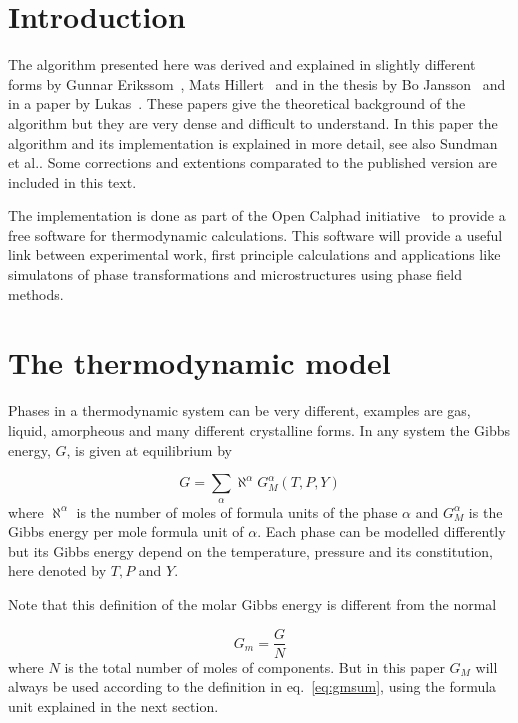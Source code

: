 \documentclass[12pt]{article}
\begin{document}
\tableofcontents

\newpage

\section{Introduction}

The algorithm presented here was derived and explained in slightly
different forms by Gunnar Erikssom~\cite{75Eri}, Mats
Hillert~\cite{81Hil} and in the thesis by Bo Jansson~\cite{84Jan} and
in a paper by Lukas~\cite{82Luk}.  These papers give the theoretical
background of the algorithm but they are very dense and difficult to
understand.  In this paper the algorithm and its implementation is
explained in more detail, see also Sundman et al.\cite{15Sun2}.  Some
corrections and extentions comparated to the published version are
included in this text.

The implementation is done as part of the Open Calphad
initiative~\cite{15Sun1} to provide a free software for thermodynamic
calculations.  This software will provide a useful link between
experimental work, first principle calculations and applications like
simulatons of phase transformations and microstructures using phase
field methods.

\section{The thermodynamic model}

Phases in a thermodynamic system can be very different, examples are
gas, liquid, amorpheous and many different crystalline forms.  In any
system the Gibbs energy, $G$, is given at equilibrium by

\begin{equation}
G = \sum_{\alpha} \aleph^{\alpha} G_M^{\alpha}(T,P,Y) \label{eq:gmsum}
\end{equation}
where $\aleph^{\alpha}$ is the number of moles of formula units of the
phase $\alpha$ and $G_M^{\alpha}$ is the Gibbs energy per mole formula
unit of $\alpha$.  Each phase can be modelled differently but its
Gibbs energy depend on the temperature, pressure and its constitution,
here denoted by $T, P$ and $Y$.

Note that this definition of the molar Gibbs energy is different from
the normal

\begin{equation}
G_m = \frac{G}{N}\label{eq:molg1}
\end{equation}
where $N$ is the total number of moles of components.  But in this
paper $G_M$ will always be used according to the definition in
eq.~\ref{eq:gmsum}, using the formula unit explained in the next
section.
\end{document}
